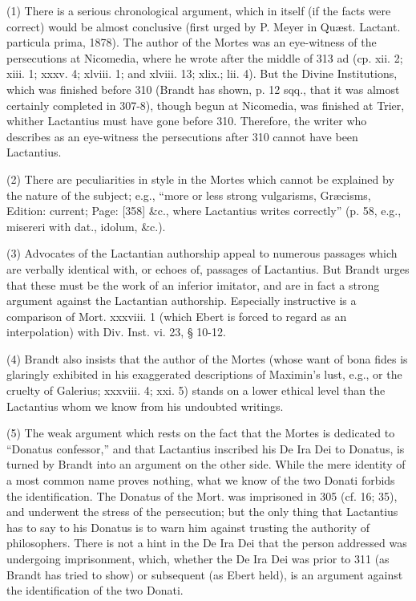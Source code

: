 (1) There is a serious chronological argument, which in itself (if the facts were correct) would be almost conclusive (first urged by P. Meyer in Quæst. Lactant. particula prima, 1878). The author of the Mortes was an eye-witness of the persecutions at Nicomedia, where he wrote after the middle of 313 ad (cp. xii. 2; xiii. 1; xxxv. 4; xlviii. 1; and xlviii. 13; xlix.; lii. 4). But the Divine Institutions, which was finished before 310 (Brandt has shown, p. 12 sqq., that it was almost certainly completed in 307-8), though begun at Nicomedia, was finished at Trier, whither Lactantius must have gone before 310. Therefore, the writer who describes as an eye-witness the persecutions after 310 cannot have been Lactantius.

(2) There are peculiarities in style in the Mortes which cannot be explained by the nature of the subject; e.g., \texthebrew{“}more or less strong vulgarisms, Græcisms, Edition: current; Page: [358] \&c., where Lactantius writes correctly\texthebrew{}” (p. 58, e.g., misereri with dat., idolum, \&c.).

(3) Advocates of the Lactantian authorship appeal to numerous passages which are verbally identical with, or echoes of, passages of Lactantius. But Brandt urges that these must be the work of an inferior imitator, and are in fact a strong argument against the Lactantian authorship. Especially instructive is a comparison of Mort. xxxviii. 1 (which Ebert is forced to regard as an interpolation) with Div. Inst. vi. 23, § 10-12.

(4) Brandt also insists that the author of the Mortes (whose want of bona fides is glaringly exhibited in his exaggerated descriptions of Maximin\texthebrew{}’s lust, e.g., or the cruelty of Galerius; xxxviii. 4; xxi. 5) stands on a lower ethical level than the Lactantius whom we know from his undoubted writings.

(5) The weak argument which rests on the fact that the Mortes is dedicated to \texthebrew{“}Donatus confessor,\texthebrew{}” and that Lactantius inscribed his De Ira Dei to Donatus, is turned by Brandt into an argument on the other side. While the mere identity of a most common name proves nothing, what we know of the two Donati forbids the identification. The Donatus of the Mort. was imprisoned in 305 (cf. 16; 35), and underwent the stress of the persecution; but the only thing that Lactantius has to say to his Donatus is to warn him against trusting the authority of philosophers. There is not a hint in the De Ira Dei that the person addressed was undergoing imprisonment, which, whether the De Ira Dei was prior to 311 (as Brandt has tried to show) or subsequent (as Ebert held), is an argument against the identification of the two Donati.

